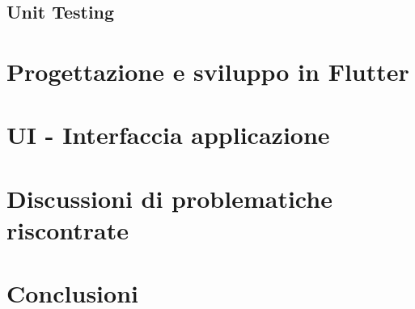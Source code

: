 \documentclass{article}
\begin{document}
\subsection{Unit Testing}

\section{Progettazione e sviluppo in Flutter}

\section{UI - Interfaccia applicazione}

\section{Discussioni di problematiche riscontrate}

\section{Conclusioni}
\end{document}
